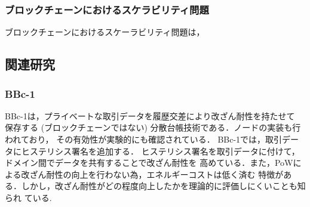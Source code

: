 \documentclass[a4paper,12pt]{jsarticle}
\begin{document}







\subsubsection{ブロックチェーンにおけるスケラビリティ問題}
ブロックチェーンにおけるスケーラビリティ問題は，



\subsection{関連研究}
\subsubsection{BBc-1}

BBc-1\cite{saito}は，プライベートな取引データを履歴交差により改ざん耐性を持たせて
保存する (ブロックチェーンではない) 分散台帳技術である．ノードの実装も行われており，
その有効性が実験的にも確認されている．
BBc-1では，取引データにヒステリシス署名を追加する．
ヒステリシス署名を取引データに付けて，ドメイン間でデータを共有することで改ざん耐性を
高めている．また，PoWによる改ざん耐性の向上を行わない為，エネルギーコストは低く済む
特徴がある．しかし，改ざん耐性がどの程度向上したかを理論的に評価しにくいことも知られ
ている. 
\end{document}
